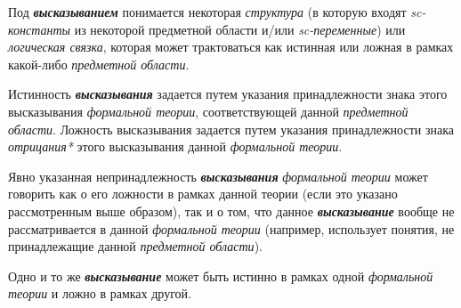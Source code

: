 Под \textbf{\textit{высказыванием}} понимается некоторая \textit{структура} (в которую входят \textit{sc-константы} из некоторой предметной области и/или \textit{sc-переменные}) или \textit{логическая связка}, которая может трактоваться как истинная или ложная в рамках какой-либо \textit{предметной области}.

Истинность \textbf{\textit{высказывания}} задается путем указания принадлежности знака этого высказывания \textit{формальной теории}, соответствующей данной \textit{предметной области}. Ложность высказывания задается путем указания принадлежности знака \textit{отрицания*} этого высказывания данной \textit{формальной теории}.

Явно указанная непринадлежность \textbf{\textit{высказывания}} \textit{формальной теории} может говорить как о его ложности в рамках данной теории (если это указано рассмотренным выше образом), так и о том, что данное  \textbf{\textit{высказывание}} вообще не рассматривается в данной \textit{формальной теории} (например, использует понятия, не принадлежащие данной \textit{предметной области}).

Одно и то же \textbf{\textit{высказывание}} может быть истинно в рамках одной \textit{формальной теории} и ложно в рамках другой.



